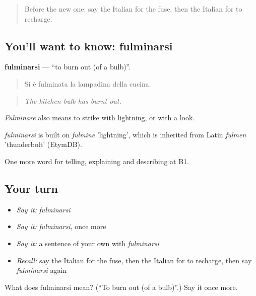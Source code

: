 \label{lesson:IT-C436-fulminarsi}



\begin{quote}
Before the new one: say the Italian for the fuse, then the Italian for to recharge.
\end{quote}

\subsection*{You'll want to know: fulminarsi}
\textbf{fulminarsi} — \textquotedblleft{}to burn out (of a bulb)\textquotedblright{}.

\begin{quote}
Si è fulminata la lampadina della cucina.
\end{quote}

\begin{quote}
\emph{The kitchen bulb has burnt out.}
\end{quote}

\emph{Fulminare} also means to strike with lightning, or with a look.

\begin{cousinweb}
\emph{fulminarsi} is built on \emph{fulmine} 'lightning', which is inherited from Latin \emph{fulmen} 'thunderbolt' (EtymDB).
\end{cousinweb}

\begin{grammarlens}[title={What you've built}]
One more word for telling, explaining and describing at B1.
\end{grammarlens}

\subsection*{Your turn}
\begin{itemize}
\raggedright
  \item \emph{Say it:} \emph{fulminarsi}
  \item \emph{Say it:} \emph{fulminarsi}, once more
  \item \emph{Say it:} a sentence of your own with \emph{fulminarsi}
  \item \emph{Recall:} say the Italian for the fuse, then the Italian for to recharge, then say \emph{fulminarsi} again
\end{itemize}

\begin{tcolorbox}[breakable,colback=teal!4,colframe=teal!35!black,title={Before you move on}]
What does fulminarsi mean? (\textquotedblleft{}To burn out (of a bulb)\textquotedblright{}.) Say it once more.
\end{tcolorbox}
